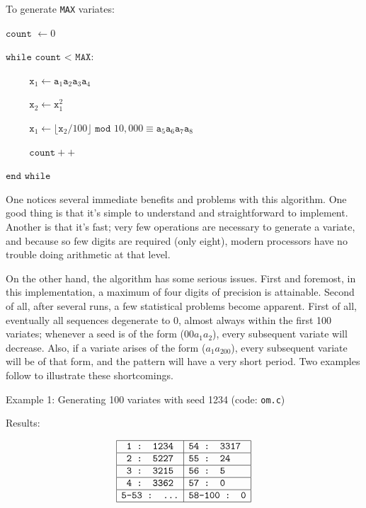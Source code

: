 \documentclass[11pt]{article}
\begin{document}
To generate \texttt{MAX} variates:

$\texttt{count } \leftarrow 0$

$\texttt{while count < MAX:}$

$\hspace{1cm}\texttt{x}_1 \leftarrow \texttt{a}_1\texttt{a}_2\texttt{a}_3\texttt{a}_4$

$\hspace{1cm}\texttt{x}_2 \leftarrow \texttt{x}_1^2$

$\hspace{1cm}\texttt{x}_1 \leftarrow \lfloor \texttt{x}_2 / 100\rfloor \texttt{ mod } 10,000 \equiv \texttt{a}_{5}\texttt{a}_{6}\texttt{a}_{7}\texttt{a}_{8}$

$\hspace{1cm}\texttt{count}++$

$\texttt{end while}$


One notices several immediate benefits and problems with this algorithm.  One good thing is that it's simple to understand and straightforward to implement.  Another is that it's fast; very few operations are necessary to generate a variate, and because so few digits are required (only eight), modern processors have no trouble doing arithmetic at that level.

On the other hand, the algorithm has some serious issues. First and foremost, in this implementation, a maximum of four digits of precision is attainable.  Second of all, after several runs, a few statistical problems become apparent.  First of all, eventually all sequences degenerate to 0, almost always within the first 100 variates; whenever a seed is of the form ($00a_1a_2$), every subsequent variate will decrease.  Also, if a variate arises of the form ($a_1a_200$), every subsequent variate will be of that form, and the pattern will have a very short period.  Two examples follow to illustrate these shortcomings.

\newpage

Example 1: Generating 100 variates with seed 1234 (code: \texttt{om.c})

Results:

$$\begin{array}{|c|l|}\hline
\texttt{1 : 1234} & \texttt{54 : 3317}\\\hline
\texttt{2 : 5227} & \texttt{55 : 24}\\\hline
\texttt{3 : 3215} & \texttt{56 : 5}\\\hline
\texttt{4 : 3362} & \texttt{57 : 0}\\\hline
\texttt{5-53 : ...} & \texttt{58-100 : 0}\\\hline
\end{array}$$
\end{document}

